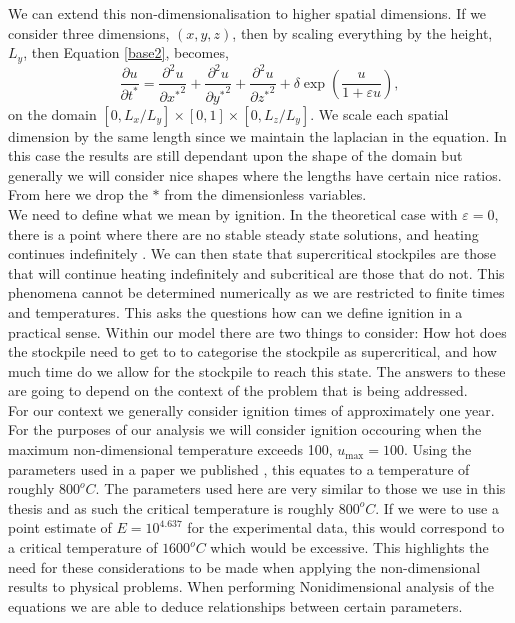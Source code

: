We can extend this non-dimensionalisation to higher spatial dimensions. If we consider three dimensions, $(x,y,z)$, then by scaling everything by the height, $L_y$, then Equation \ref{base2}, becomes,
\begin{equation}
\frac{\partial u}{\partial t^*}=\frac{\partial^2 u}{\partial {x^*}^2}+\frac{\partial^2 u}{\partial {y^*}^2}+\frac{\partial^2 u}{\partial {z^*}^2}+\delta\exp\left(\frac{u}{1+\varepsilon u}\right),
\end{equation}
on the domain $[0,L_x/L_y]\times[0,1]\times[0,L_z/L_y]$. We scale each spatial dimension by the same length since we maintain the laplacian in the equation. In this case the results are still dependant upon the shape of the domain but generally we will consider nice shapes where the lengths have certain nice ratios. From here we drop the $*$ from the dimensionless variables.\\

We need to define what we mean by ignition. In the theoretical case with $\varepsilon=0$, there is a point where there are no stable steady state solutions, and heating continues indefinitely \cite{bowes}. We can then state that supercritical stockpiles are those that will continue heating indefinitely and subcritical are those that do not. This phenomena cannot be determined numerically as we are restricted to finite times and temperatures. This asks the questions how can we define ignition in a practical sense. Within our model there are two things to consider: How hot does the stockpile need to get to to categorise the stockpile as supercritical, and how much time do we allow for the stockpile to reach this state. The answers to these are going to depend on the context of the problem that is being addressed. \\

For our context we generally consider ignition times of approximately one year. For the purposes of our analysis we will consider ignition occouring when the maximum non-dimensional temperature exceeds 100, $u_{\text{max}}=100$. Using the parameters used in a paper we published \cite{Berry19}, this equates to a temperature of roughly $800^oC$. The parameters used here are very similar to those we use in this thesis and as such the critical temperature is roughly $800^oC$. If we were to use a point estimate of $E=10^4.637$ for the experimental data, this would correspond to a critical temperature of $1600^oC$ which would be excessive. This highlights the need for these considerations to be made when applying the non-dimensional results to physical problems. When performing Nonidimensional analysis of the equations we are able to deduce relationships between certain parameters. 


